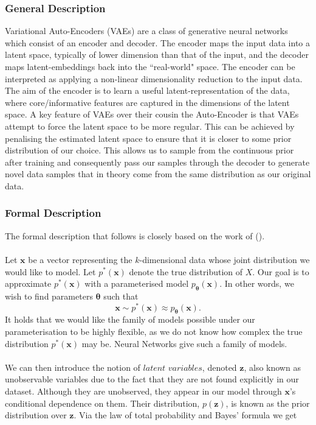 \documentclass{article}
\theoremstyle{definition}
\begin{document}
\subsubsection{General Description}
Variational Auto-Encoders (VAEs) are a class of generative neural networks which consist of an encoder and decoder. The encoder maps the input data into a latent space, typically of lower dimension than that of the input, and the decoder maps latent-embeddings back into the ``real-world" space. The encoder can be interpreted as applying a non-linear dimensionality reduction to the input data. The aim of the encoder is to learn a useful latent-representation of the data, where core/informative features are captured in the dimensions of the latent space. A key feature of VAEs over their cousin the Auto-Encoder is that VAEs attempt to force the latent space to be more regular. This can be achieved by penalising the estimated latent space to ensure that it is closer to some prior distribution of our choice. This allows us to sample from the continuous prior after training and consequently pass our samples through the decoder to generate novel data samples that in theory come from the same distribution as our original data.

\subsubsection{Formal Description}
The formal description that follows is closely based on the work of (\cite{kingma2019introduction}). \\\\Let $\mathbf{x}$ be a vector representing the $k$-dimensional data whose joint distribution we would like to model. Let $p^{*}(\mathbf{x})$ denote the true distribution of $X$. Our goal is to approximate $p^{*}(\mathbf{x})$ with a parameterised model $p_{\boldsymbol{\theta}}(\mathbf{x})$. In other words, we wish to find parameters $\boldsymbol{\theta}$ such that $$\mathbf{x} \sim p^{*}(\mathbf{x}) \approx p_{\boldsymbol{\theta}}(\mathbf{x}).$$ It holds that we would like the family of models possible under our parameterisation to be highly flexible, as we do not know how complex the true distribution $p^{*}(\mathbf{x})$ may be. Neural Networks give such a family of models.
\\\\
We can then introduce the notion of $\textit{latent variables}$, denoted $\mathbf{z}$, also known as unobservable variables due to the fact that they are not found explicitly in our dataset. Although they are unobserved, they appear in our model through $\mathbf{x}$'s conditional dependence on them. Their distribution, $p(\mathbf{z})$, is known as the prior distribution over $\mathbf{z}$. Via the law of total probability and Bayes' formula we get 
\end{document}
